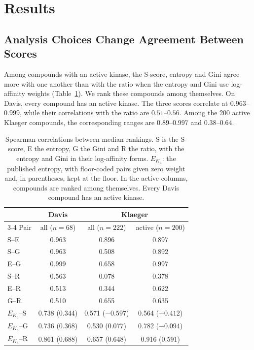 \section{Results}
\label{sec:results}

\subsection{Analysis Choices Change Agreement Between Scores}
\label{sec:results:families}

Among compounds with an active kinase, the S-score, entropy and Gini agree
more with one another than with the ratio when the entropy and Gini use
log-affinity weights (Table~\ref{tab:correlations}). We rank these compounds
among themselves. On Davis, every compound has an active kinase. The three
scores correlate at $0.963$--$0.999$, while their correlations with the ratio
are $0.51$--$0.56$. Among the 200 active Klaeger compounds, the corresponding
ranges are $0.89$--$0.997$ and $0.38$--$0.64$.

\begin{table}[h]
  \centering
  \caption{Spearman correlations between median rankings. S is the S-score, E
           the entropy, G the Gini and R the ratio, with the entropy and Gini in their
           log-affinity forms. $E_{K_a}$: the published entropy, with
           floor-coded pairs given zero weight and, in parentheses, kept at the
           floor. In the active columns, compounds are ranked among themselves.
           Every Davis compound has an active kinase.}
  \label{tab:correlations}
  \begin{tabular}{lccc}
    \toprule
         & Davis & \multicolumn{2}{c}{Klaeger} \\
    \cmidrule(lr){3-4}
    Pair & all ($n = 68$) & all ($n = 222$) & active ($n = 200$) \\
    \midrule
    S--E & 0.963 & 0.896 & 0.897 \\
    S--G & 0.963 & 0.508 & 0.892 \\
    E--G & 0.999 & 0.658 & 0.997 \\
    S--R & 0.563 & 0.078 & 0.378 \\
    E--R & 0.513 & 0.344 & 0.622 \\
    G--R & 0.510 & 0.655 & 0.635 \\
    \midrule
    $E_{K_a}$--S & 0.738 (0.344) & 0.571 ($-0.597$) & 0.564 ($-0.412$) \\
    $E_{K_a}$--G & 0.736 (0.368) & 0.530 (0.077)    & 0.782 ($-0.094$) \\
    $E_{K_a}$--R & 0.861 (0.688) & 0.657 (0.648)    & 0.916 (0.591) \\
    \bottomrule
  \end{tabular}
\end{table}

